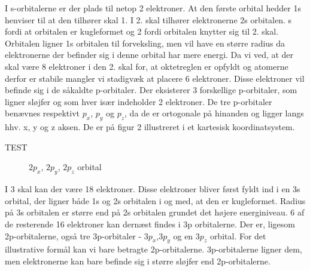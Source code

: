 \documentclass[12pt,a4paper]{article}
\theoremstyle{break}
\theoremstyle{nonumberplain}
\begin{document}
  I s-orbitalerne er der plads til netop 2 elektroner. At den første orbital hedder 1s henviser til at den tilhører skal 1. I 2. skal tilhører elektronerne 2s orbitalen. s fordi at orbitalen er kugleformet og 2 fordi orbitalen knytter sig til 2. skal. Orbitalen ligner 1s orbitalen til forveksling, men vil have en større radius da elektronerne der befinder sig i denne orbital har mere energi. Da vi ved, at der skal være 8 elektroner i den 2. skal for, at oktetreglen er opfyldt og atomerne derfor er stabile mangler vi stadigvæk at placere 6 elektroner. Disse elektroner vil befinde sig i de såkaldte p-orbitaler. Der eksisterer 3 forskellige p-orbitaler, som ligner sløjfer og som hver især indeholder 2 elektroner. De tre p-orbitaler benævnes respektivt $p_x$, $p_y$ og $p_z$, da de er ortogonale på hinanden og ligger langs hhv. x, y og z aksen. De er på figur 2 illustreret i et kartesisk koordinatsystem.
  
TEST
 
\begin{figure}[ht!]
  \centering
  \caption{$2p_x$, $2p_y$, $2p_z$ orbital} \end{figure}

I 3 skal kan der være 18 elektroner. Disse elektroner bliver først fyldt ind i en 3s orbital, der ligner både 1s og 2s orbitalen i og med, at den er kugleformet. Radius på 3s orbitalen er større end på 2s orbitalen grundet det højere energiniveau. 6 af de resterende 16 elektroner kan dernæst findes i 3p orbitalerne. Der er, ligesom 2p-orbitalerne, også tre 3p-orbitaler - $3p_x$,$3p_y$ og en $3p_z$ orbital. For det illustrative formål kan vi bare betragte 2p-orbitalerne. 3p-orbitalerne ligner dem, men elektronerne kan bare befinde sig i større sløjfer end 2p-orbitalerne. 
\end{document}
